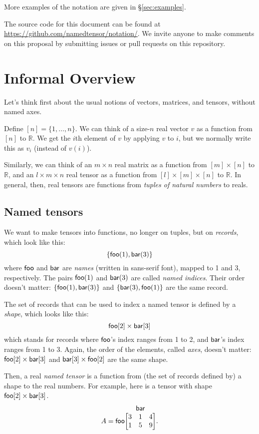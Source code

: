 \documentclass{article}
\makeatletter
\newcommand{\nmatrix}[3]{\name{#1}\begin{array}[b]{@{}c@{}}\name{#2}\\\begin{bmatrix}#3\end{bmatrix}\end{array}}
\makeatother
\begin{document}
More examples of the notation are given in \S\ref{sec:examples}.

The source code for this document can be found at \url{https://github.com/namedtensor/notation/}. We invite anyone to make comments on this proposal by submitting issues or pull requests on this repository.

\section{Informal Overview}
\label{sec:intro}

Let's think first about the usual notions of vectors, matrices, and tensors, without named axes.

Define $[n] = \{1, \ldots, n\}$. We can think of a size-$n$ real vector $v$ as a function from $[n]$ to $\mathbb{R}$. We get the $i$th element of $v$ by applying $v$ to $i$, but we normally write this as $v_i$ (instead of $v(i)$). 

Similarly, we can think of an $m \times n$ real matrix as a function from $[m] \times [n]$ to $\mathbb{R}$, and an $l \times m \times n$ real tensor as a function from $[l] \times [m] \times [n]$ to $\mathbb{R}$. In general, then, real tensors are functions from \emph{tuples of natural numbers} to reals.

\subsection{Named tensors}

We want to make tensors into functions, no longer on tuples, but on \emph{records}, which look like this: \[\{\mathsf{foo}(1), \mathsf{bar}(3)\}\] where $\mathsf{foo}$ and $\mathsf{bar}$ are \emph{names} (written in sans-serif font), mapped to 1 and 3, respectively. The pairs $\mathsf{foo}(1)$ and $\mathsf{bar}(3)$ are called \emph{named indices}. Their order doesn't matter: $\{\mathsf{foo}(1), \mathsf{bar}(3)\}$ and $\{\mathsf{bar}(3), \mathsf{foo}(1)\}$ are the same record.

The set of records that can be used to index a named tensor is defined by a \emph{shape}, which looks like this: \[\mathsf{foo}[2] \times \mathsf{bar}[3]\] which stands for records where $\mathsf{foo}$'s index ranges from 1 to 2, and $\mathsf{bar}$'s index ranges from 1 to 3. Again, the order of the elements, called \emph{axes}, doesn't matter: $\mathsf{foo}[2] \times \mathsf{bar}[3]$ and $\mathsf{bar}[3] \times \mathsf{foo}[2]$ are the same shape.

Then, a real \emph{named tensor} is a function from (the set of records defined by) a shape to the real numbers. For example, here is a tensor with shape $\mathsf{foo}[2] \times \mathsf{bar}[3]$.
\begin{equation*}
A = \nmatrix{foo}{bar}{
  3 & 1 & 4 \\
  1 & 5 & 9
}.
\end{equation*}
\end{document}
